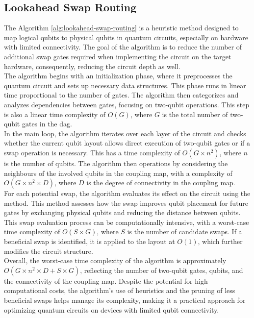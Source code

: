 \subsection{Lookahead Swap Routing} %
The Algorithm \ref{alg:lookahead-swap-routing}  is a heuristic method designed to map logical qubits to physical qubits in quantum circuits, especially on hardware with limited connectivity. The goal of the algorithm is to reduce the number of additional swap gates required when implementing the circuit on the target hardware, consequently, reducing the circuit depth as well. \\
The algorithm begins with an initialization phase, where it preprocesses the quantum circuit and sets up necessary data structures. This phase runs in linear time proportional to the number of gates. The algorithm then categorizes and analyzes dependencies between gates, focusing on two-qubit operations. This step is also a linear time complexity of $O(G)$, where $G$ is the total number of two-qubit gates in the \acrshort{dag}. \\
In the main loop, the algorithm iterates over each layer of the circuit and checks whether the current qubit layout allows direct execution of two-qubit gates or if a swap operation is necessary. This  has a time complexity of $O(G \times n^2)$, where $n$ is the number of qubits. The algorithm then  operations by considering the neighbours of the involved qubits in the coupling map, with a complexity of $O(G \times n^2 \times D)$, where $D$ is the degree of connectivity in the coupling map. \\
For each potential swap, the algorithm evaluates its effect on the circuit using the  method. This method assesses how the swap improves qubit placement for future gates by exchanging physical qubits and reducing the distance between qubits. This swap evaluation process can be computationally intensive, with a worst-case time complexity of $O(S \times G)$, where $S$ is the number of candidate swaps. If a beneficial swap is identified, it is applied to the layout at $O(1)$, which further modifies the circuit structure. \\
Overall, the worst-case time complexity of the  algorithm is approximately $O(G \times n^2 \times D + S \times G)$, reflecting the number of two-qubit gates, qubits, and the connectivity of the coupling map. Despite the potential for high computational costs, the algorithm's use of heuristics and the pruning of less beneficial swaps helps manage its complexity, making it a practical approach for optimizing quantum circuits on devices with limited qubit connectivity.

